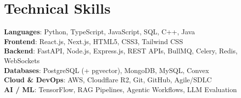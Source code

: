 \documentclass[a4paper,11pt]{article}
\begin{document}
\section{\textbf{Technical Skills}}
 \begin{itemize}[leftmargin=0.05in, label={}]
    \small{\item{
     \textbf{Languages}{: Python, TypeScript, JavaScript, SQL, C++, Java} \\
     \textbf{Frontend}{: React.js, Next.js, HTML5, CSS3, Tailwind CSS} \\
     \textbf{Backend}{: FastAPI, Node.js, Express.js, REST APIs, BullMQ, Celery, Redis, WebSockets} \\
     \textbf{Databases}{: PostgreSQL (+ pgvector), MongoDB, MySQL, Convex} \\
     \textbf{Cloud \& DevOps}{: AWS, Cloudflare R2, Git, GitHub, Agile/SDLC} \\
     \textbf{AI / ML}{: TensorFlow, RAG Pipelines, Agentic Workflows, LLM Evaluation} \\
    }}
 \end{itemize}
\vspace{-8pt}
\end{document}
